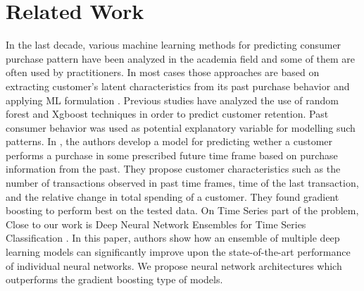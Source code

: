 \section{Related Work}
In the last decade, various machine learning methods for predicting consumer purchase pattern have been analyzed in
the academia field and some of them are often used by practitioners. In most cases those approaches are based on extracting 
customer’s latent characteristics from its past purchase behavior and applying ML formulation \cite{fader2009probability}. 
Previous studies have analyzed the use of random forest and Xgboost techniques in order to predict 
customer retention. Past consumer behavior was used as potential explanatory variable 
for modelling such patterns. In \cite{martinez2020machine}, the authors develop a model for predicting wether a 
customer performs a purchase in some prescribed future time frame based on purchase information from the past. 
They propose customer characteristics such as the number of transactions observed in past time frames, 
time of the last transaction, and the relative change in total spending of a customer. 
They found gradient boosting to perform best on the tested data. On Time Series part of the problem,
Close to our work is Deep Neural Network Ensembles for Time Series Classification \cite{fawaz2019deep}. 
In this paper, authors show how an ensemble of multiple deep learning models can significantly improve upon the 
state-of-the-art performance of individual neural networks.
We propose neural network architectures which outperforms the gradient boosting type of models.

